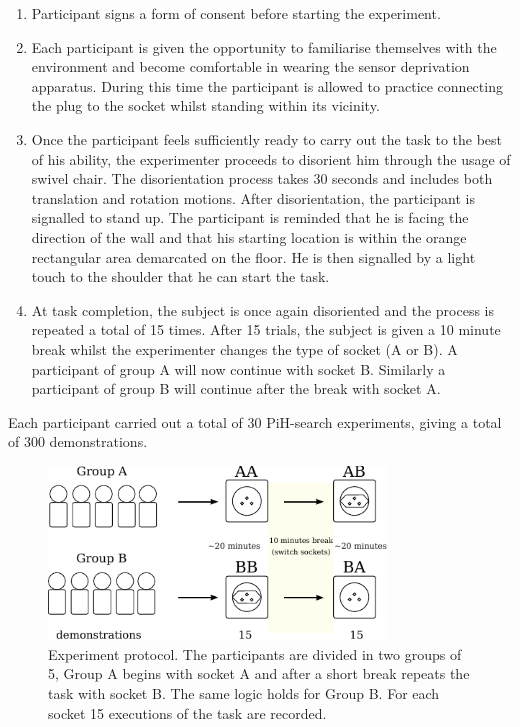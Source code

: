 \begin{enumerate}
 \item Participant signs a form of consent before starting the experiment.
 \item Each participant is given the opportunity to familiarise themselves with the environment and become 
 comfortable in wearing the sensor deprivation apparatus.
 During this time the participant is allowed to practice connecting the plug to the socket whilst standing within its vicinity.  
 \item Once the participant feels sufficiently ready to carry out the task to the best of his ability, the experimenter 
  proceeds to disorient him through the usage of swivel chair. The disorientation process takes 30 seconds and includes
  both translation and rotation motions. After disorientation, the participant is signalled to stand up. The participant
  is reminded that he is facing the direction of the wall and that his starting location is within the orange 
  rectangular area demarcated on the floor. He is then signalled by a light touch to the shoulder 
  that he can start the task.
  \item At task completion, the subject is once again disoriented and the process is repeated a total of 15 times.
  After 15 trials, the subject is given a 10 minute break whilst the experimenter changes the type of socket (A or B). 
  A participant of group A will now continue with socket B. Similarly a participant of group B will continue after the break 
  with socket A.
\end{enumerate}

Each participant carried out a total of 30 PiH-search experiments, giving a total of 300 demonstrations.

\begin{figure}
\centering
 \includegraphics[width=0.8\textwidth]{./ch4-PiH/Figures/Fig/experiment_design_v2.pdf}
 \caption{Experiment protocol. The participants are divided in two groups of 5, Group A begins with socket A 
 and after a short break repeats the task with socket B. The same logic holds for Group B.
 For each socket 15 executions of the task are recorded.}
 \label{fig:experiment_design}
\end{figure}

